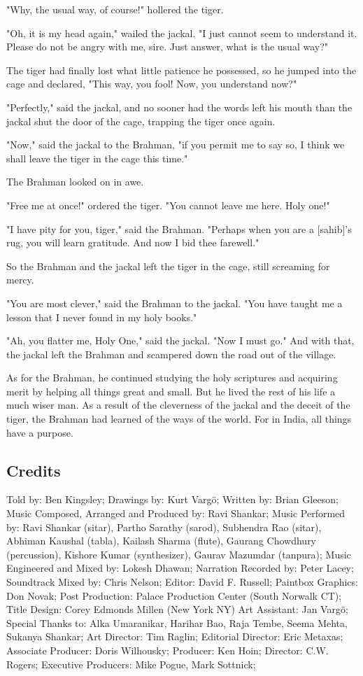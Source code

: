 "Why, the usual way, of course!" hollered the tiger.

"Oh, it is my head again," wailed the jackal. "I just cannot seem to understand it. Please do not be angry with me, sire. Just answer, what is the usual way?"

The tiger had finally lost what little patience he possessed, so he jumped into the cage and declared, "This way, you fool! Now, you understand now?"

"Perfectly," said the jackal, and no sooner had the words left his mouth than the jackal shut the door of the cage, trapping the tiger once again.

"Now," said the jackal to the Brahman, "if you permit me to say so, I think we shall leave the tiger in the cage this time."

The Brahman looked on in awe.

"Free me at once!" ordered the tiger. "You cannot leave me here. Holy one!"

"I have pity for you, tiger," said the Brahman. "Perhaps when you are a [sahib]'s rug, you will learn gratitude. And now I bid thee farewell."

So the Brahman and the jackal left the tiger in the cage, still screaming for mercy.

"You are most clever," said the Brahman to the jackal. "You have taught me a lesson that I never found in my holy books."

"Ah, you flatter me, Holy One," said the jackal. "Now I must go." And with that, the jackal left the Brahman and scampered down the road out of the village.

As for the Brahman, he continued studying the holy scriptures and acquiring merit by helping all things great and small. But he lived the rest of his life a much wiser man. As a result of the cleverness of the jackal and the deceit of the tiger, the Brahman had learned of the ways of the world. For in India, all things have a purpose.

\subsection{Credits}

Told by: Ben Kingsley;
Drawings by: Kurt Vargö;
Written by: Brian Gleeson;
Music Composed, Arranged and Produced by: Ravi Shankar;
Music Performed by: Ravi Shankar (sitar), Partho Sarathy (sarod), Subhendra Rao (sitar), Abhiman Kaushal (tabla), Kailash Sharma (flute), Gaurang Chowdhury (percussion), Kishore Kumar (synthesizer), Gaurav Mazumdar (tanpura);
Music Engineered and Mixed by: Lokesh Dhawan;
Narration Recorded by: Peter Lacey;
Soundtrack Mixed by: Chris Nelson;
Editor: David F. Russell;
Paintbox Graphics: Don Novak;
Post Production: Palace Production Center (South Norwalk CT);
Title Design: Corey Edmonds Millen (New York NY)
Art Assistant: Jan Vargö;
Special Thanks to: Alka Umaranikar, Harihar Bao, Raja Tembe, Seema Mehta, Sukanya Shankar;
Art Director: Tim Raglin;
Editorial Director: Eric Metaxas;
Associate Producer: Doris Wilhousky;
Producer: Ken Hoin;
Director: C.W. Rogers;
Executive Producers: Mike Pogue, Mark Sottnick;

